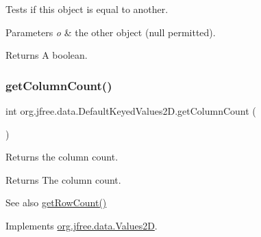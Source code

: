 Tests if this object is equal to another.


\begin{DoxyParams}{Parameters}
{\em o} & the other object ({\ttfamily null} permitted).\\
\hline
\end{DoxyParams}
\begin{DoxyReturn}{Returns}
A boolean. 
\end{DoxyReturn}
\mbox{\label{classorg_1_1jfree_1_1data_1_1_default_keyed_values2_d_add387af47bf3263842b9c06ef212bad2}} 
\subsubsection{\texorpdfstring{get\+Column\+Count()}{getColumnCount()}}
{\footnotesize\ttfamily int org.\+jfree.\+data.\+Default\+Keyed\+Values2\+D.\+get\+Column\+Count (\begin{DoxyParamCaption}{ }\end{DoxyParamCaption})}

Returns the column count.

\begin{DoxyReturn}{Returns}
The column count.
\end{DoxyReturn}
\begin{DoxySeeAlso}{See also}
\mbox{\hyperlink{classorg_1_1jfree_1_1data_1_1_default_keyed_values2_d_aaa4f83398caf1c5a2e59e719d72de13f}{get\+Row\+Count()}} 
\end{DoxySeeAlso}


Implements \mbox{\hyperlink{interfaceorg_1_1jfree_1_1data_1_1_values2_d_a212e32802dc2f32e0fb641740137c685}{org.\+jfree.\+data.\+Values2D}}.

\mbox{\label{classorg_1_1jfree_1_1data_1_1_default_keyed_values2_d_a7850b37a7f84b089906f1713b6fef6f0}} 
